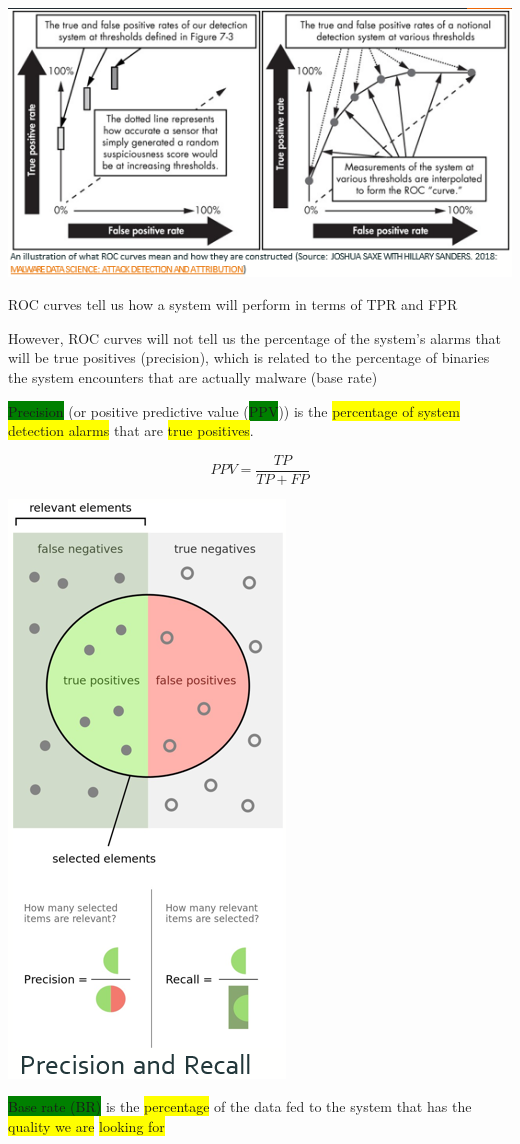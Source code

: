 \documentclass[]{project_plan}
\begin{document}
\includegraphics[width=.8\linewidth]{ml104.png}

ROC curves tell us how a system will perform in terms of TPR and FPR

However, ROC curves will not tell us the percentage of the system’s alarms that
will be true positives (precision), which is related to the percentage of
binaries the system encounters that are actually malware (base rate)

\colorbox{green}{Precision} (or positive predictive value (\colorbox{green}{PPV})) is the \colorbox{yellow}{percentage of system
  detection alarms} that are \colorbox{yellow}{true positives}.

\[
  PPV = \frac{TP}{TP + FP}
\]

\includegraphics[width=.4\linewidth]{ml106.png}

\colorbox{green}{Base rate (BR)} is the \colorbox{yellow}{percentage} of the data fed to the system that has the \colorbox{yellow}{quality
  we are} \colorbox{yellow}{looking for}
\end{document}
